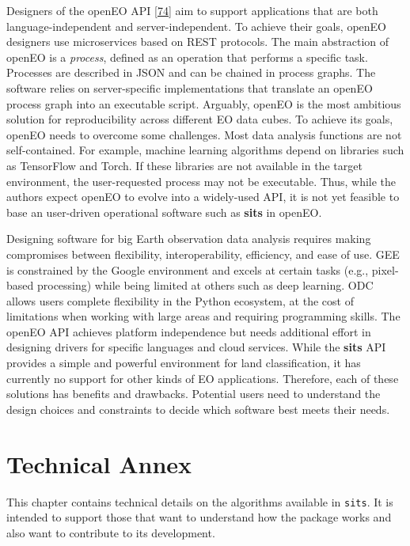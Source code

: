 \documentclass[
  11pt,
]{report}
\newcommand{\passthrough}[1]{#1}
\begin{document}
Designers of the openEO API
\protect\hyperlink{ref-Schramm2021}{{[}74{]}} aim to support
applications that are both language-independent and server-independent.
To achieve their goals, openEO designers use microservices based on REST
protocols. The main abstraction of openEO is a \textit{process}, defined
as an operation that performs a specific task. Processes are described
in JSON and can be chained in process graphs. The software relies on
server-specific implementations that translate an openEO process graph
into an executable script. Arguably, openEO is the most ambitious
solution for reproducibility across different EO data cubes. To achieve
its goals, openEO needs to overcome some challenges. Most data analysis
functions are not self-contained. For example, machine learning
algorithms depend on libraries such as TensorFlow and Torch. If these
libraries are not available in the target environment, the
user-requested process may not be executable. Thus, while the authors
expect openEO to evolve into a widely-used API, it is not yet feasible
to base an user-driven operational software such as \textbf{sits} in
openEO.

Designing software for big Earth observation data analysis requires
making compromises between flexibility, interoperability, efficiency,
and ease of use. GEE is constrained by the Google environment and excels
at certain tasks (e.g., pixel-based processing) while being limited at
others such as deep learning. ODC allows users complete flexibility in
the Python ecosystem, at the cost of limitations when working with large
areas and requiring programming skills. The openEO API achieves platform
independence but needs additional effort in designing drivers for
specific languages and cloud services. While the \textbf{sits} API
provides a simple and powerful environment for land classification, it
has currently no support for other kinds of EO applications. Therefore,
each of these solutions has benefits and drawbacks. Potential users need
to understand the design choices and constraints to decide which
software best meets their needs.

\hypertarget{technical-annex}{%
\chapter*{Technical Annex}\label{technical-annex}}

This chapter contains technical details on the algorithms available in
\passthrough{\lstinline!sits!}. It is intended to support those that
want to understand how the package works and also want to contribute to
its development.
\end{document}
